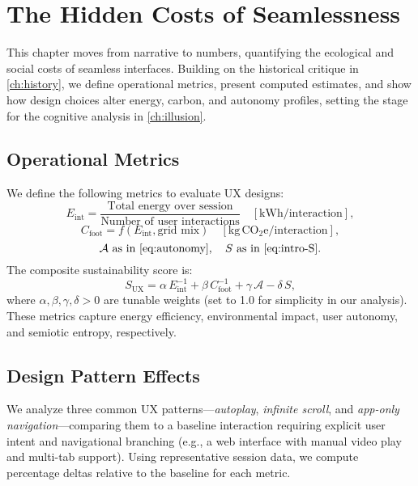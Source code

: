 \documentclass[openany]{book}
\newcommand{\Sent}{S} %
\newcommand{\Eint}{E_{\mathrm{int}}} %
\newcommand{\Cfoot}{C_{\mathrm{foot}}} %
\newcommand{\Auton}{\mathcal{A}} %
\newcommand{\SUX}{S_{\mathrm{UX}}} %
\newcommand{\kWh}{\mathrm{kWh}}
\begin{document}
\chapter{The Hidden Costs of Seamlessness}
\label{ch:hidden-costs}

This chapter moves from narrative to numbers, quantifying the ecological and social costs of seamless interfaces. Building on the historical critique in \cref{ch:history}, we define operational metrics, present computed estimates, and show how design choices alter energy, carbon, and autonomy profiles, setting the stage for the cognitive analysis in \cref{ch:illusion}.

\section{Operational Metrics}
\label{sec:metrics-def}
We define the following metrics to evaluate UX designs:
\begin{equation}
\Eint = \frac{\text{Total energy over session}}{\text{Number of user interactions}} \quad [\kWh/\text{interaction}],
\end{equation}
\begin{equation}
\Cfoot = f(\Eint, \text{grid mix}) \quad [\mathrm{kg\,CO_2e}/\text{interaction}],
\end{equation}
\begin{equation}
\Auton \text{ as in \cref{eq:autonomy}}, \quad \Sent \text{ as in \cref{eq:intro-S}}.
\end{equation}
The composite sustainability score is:
\begin{equation}
\label{eq:SUX}
\SUX = \alpha\,\Eint^{-1} + \beta\,\Cfoot^{-1} + \gamma\,\Auton - \delta\,\Sent,
\end{equation}
where $\alpha, \beta, \gamma, \delta > 0$ are tunable weights (set to 1.0 for simplicity in our analysis). These metrics capture energy efficiency, environmental impact, user autonomy, and semiotic entropy, respectively.

\section{Design Pattern Effects}
\label{sec:pattern-effects}
We analyze three common UX patterns—\emph{autoplay}, \emph{infinite scroll}, and \emph{app-only navigation}—comparing them to a baseline interaction requiring explicit user intent and navigational branching (e.g., a web interface with manual video play and multi-tab support). Using representative session data, we compute percentage deltas relative to the baseline for each metric.
\end{document}
